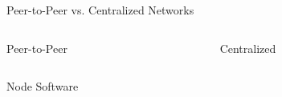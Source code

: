 \documentclass[handout]{beamer}
\begin{document}
\begin{frame}{Peer-to-Peer vs. Centralized Networks}

	\begin{columns}
		\begin{column}{0.5\textwidth}
			\begin{center}
				Peer-to-Peer
			\end{center}
		\end{column}
		\begin{column}{0.5\textwidth}
			\begin{center}
				Centralized
			\end{center}
		\end{column}
	\end{columns}
	\vspace{.8 cm}
	\begin{columns}[T]
		\begin{column}{0.5\textwidth}
			\begin{tikzpicture}[scale=0.7, every node/.style={scale=0.7}]
				
			\end{tikzpicture}
		\end{column}
		\begin{column}{0.5\textwidth}
			\begin{tikzpicture}[scale=0.7, every node/.style={scale=0.7}]
				
			\end{tikzpicture}
		\end{column}
	\end{columns}
\end{frame}


\begin{frame}{Node Software}
	\centering
	\begin{tikzpicture}[scale=0.7, every node/.style={scale=1}]
		
	\end{tikzpicture}
\end{frame}
\end{document}
